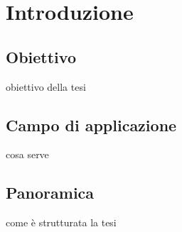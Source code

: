 \chapter{Introduzione}
\section{Obiettivo}
obiettivo della tesi

\section{Campo di applicazione}
cosa serve
\section{Panoramica}
come è strutturata la tesi
